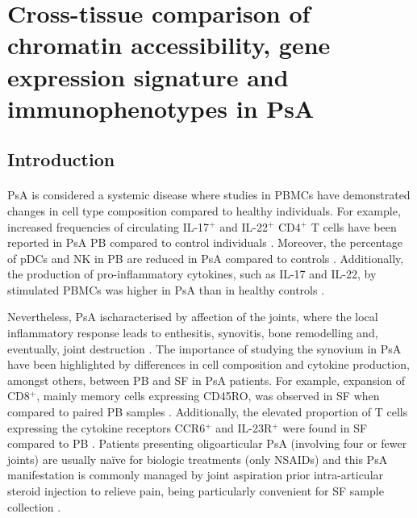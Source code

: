 \chapter{Cross-tissue comparison of chromatin accessibility, gene expression signature and immunophenotypes in PsA}
\label{ch:Results3}


\section{Introduction}

\subsubsection{}
PsA is considered a systemic disease where studies in PBMCs have demonstrated changes in cell type composition compared to healthy individuals. For example, increased frequencies of circulating IL-17$^+$ and IL-22$^+$ CD4$^+$ T cells have been reported in PsA PB compared to control individuals \parencite{Benham2013}. Moreover, the percentage of pDCs and NK in PB are reduced in PsA compared to controls \parencite{Jongbloed2008, Spadaro2004}. Additionally, the production of pro-inflammatory cytokines, such as IL-17 and IL-22, by stimulated PBMCs was higher in PsA than in healthy controls \parencite{Benham2013}. 

Nevertheless, PsA ischaracterised by affection of the joints, where the local inflammatory response leads to enthesitis, synovitis, bone remodelling and, eventually, joint destruction \parencite{}. The importance of studying the synovium in PsA have been highlighted by differences in cell composition and cytokine production, amongst others, between PB and SF in PsA patients. For example, expansion of CD8$^+$, mainly memory cells expressing CD45RO, was observed in SF when compared to paired PB samples \parencite{Ross2000}. Additionally, the elevated proportion of T cells expressing the cytokine receptors CCR6$^+$ and IL-23R$^+$ were found in SF compared to PB \parencite{Benham2013}. Patients presenting oligoarticular PsA (involving four or fewer joints) are usually na\"{i}ve for biologic treatments (only NSAIDs) and this PsA manifestation is commonly managed by joint aspiration prior intra-articular steroid injection to relieve pain, being particularly convenient for SF sample collection \parencite{Kavanaugh2006}.


